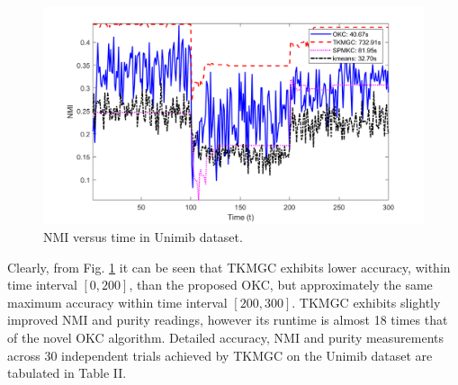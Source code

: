 \documentclass[10pt,final]{IEEEtran}
\begin{document}
\begin{figure}[htp]
    \centering
    \includegraphics[scale=0.19]{avg_combined_NMI_plots_Unimib.png}
    \caption{NMI versus time in Unimib dataset.}
    \label{Fig:4u}
\end{figure}
Clearly, from Fig. \ref{Fig:4u} it can be seen that TKMGC exhibits lower accuracy, within time interval $[0,200]$, than the proposed OKC, but approximately the same maximum accuracy within time interval $[200,300]$. TKMGC exhibits slightly improved NMI and purity readings, however its runtime is almost 18 times that of the novel OKC algorithm. Detailed accuracy, NMI and purity measurements across $30$ independent trials achieved by TKMGC on the Unimib dataset are tabulated in Table II.
\end{document}
